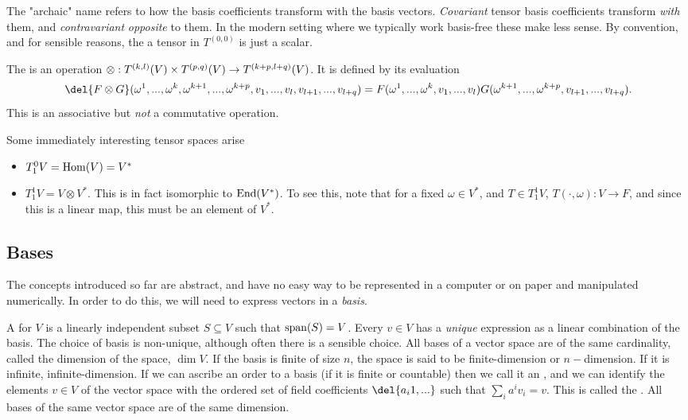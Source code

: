 The "archaic" name refers to how the basis coefficients transform with the basis vectors.
\emph{Covariant} tensor basis coefficients transform \emph{with} them, and \emph{contravariant} \emph{opposite} to them.
In the modern setting where we typically work basis-free these make less sense.
By convention, and for sensible reasons, the a tensor in \(T^{(0,0)}\) is just a scalar.

The  is an operation \(\otimes: T^{(k,l)}(V) \times T^{(p,q)}(V)\to T^{(k+p, l+q)}(V)\).
It is defined by its evaluation \[\del{F\otimes G}(\omega^1, .
	.., \omega^k, \omega^{k+1}, ..., \omega^{k+p}, v_1, ..., v_l, v_{l+1}, ..., v_{l+q})\\ = F(\omega^1, ..., \omega^k, v_1, ..., v_l) G(\omega^{k+1}, ..., \omega^{k+p}, v_{l+1}, ..., v_{l+q}).\]
This is an associative but \emph{not} a commutative operation.

Some immediately interesting tensor spaces arise
\begin{itemize}
	\item \(T_1^0V = \operatorname{Hom}(V) = V^*\)
	\item \(T_1^1V = V \otimes V^*\). This is in fact isomorphic to \(\operatorname{End}(V^*)\).
	To see this, note that for a fixed \(\omega \in V^*\), and \(T\in T_1^1V\), \(T(\cdot, \omega): V\to F\), and since this is a linear map, this must be an element of \(V^*\). 
\end{itemize}



\subsection{Bases}
\label{sec:vector_bases}
The concepts introduced so far are abstract, and have no easy way to be represented in a computer or on paper and manipulated numerically.
In order to do this, we will need to express vectors in a \emph{basis}.

A  for \(V\) is a linearly independent subset \(S \subseteq V\) such that \(\operatorname{span}(S) = V\).
Every \(v\in V\) has a \emph{unique} expression as a linear combination of the basis.
The choice of basis is non-unique, although often there is a sensible choice.
All bases of a vector space are of the same cardinality, called the dimension of the space, \(\dim V\).
If the basis is finite of size \(n\), the space is said to be finite-dimension or \(n-\)dimension.
If it is infinite, infinite-dimension.
If we can ascribe an order to a basis (if it is finite or countable) then we call it an , and we can identify the elements \(v\in V\) of the vector space with the ordered set of field coefficients \(\del{a_i1, .
	..}\) such that \(\sum_i a^i v_i  = v\).
This is called the .
All bases of the same vector space are of the same dimension.

